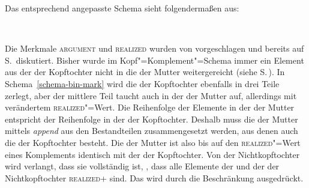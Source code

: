 {Das entsprechend angepasste Schema sieht folgendermaßen aus:
\begin{samepage}
\begin{schema}
\label{schema-bin-mark}
 \impl\\
\end{schema}
\end{samepage}

\noindent
Die Merkmale \textsc{argument} und \textsc{realized} wurden von \citet{Prze99} vorgeschlagen
und bereits auf S.\,\pageref{page-realized} diskutiert. Bisher wurde im Kopf"=Komplement"=Schema
immer ein Element aus der \compsl der Kopftochter nicht in die \compsl der Mutter weitergereicht
(siehe S.\,\pageref{schema-Kopf-Komplementschema-prel2}). In
Schema~\ref{schema-bin-mark} wird die \compsl der Kopftochter ebenfalls in drei Teile zerlegt, aber
der mittlere Teil taucht auch in der \compsl der Mutter auf, allerdings mit verändertem 
\textsc{realized}"=Wert. Die Reihenfolge der Elemente in der \compsl der Mutter entspricht der Reihenfolge in der \compsl der Kopftochter. Deshalb muss
die \compsl der Mutter mittels \emph{append}
aus den Bestandteilen zusammengesetzt werden, aus denen auch die \compsl der Kopftochter
besteht. Die \compsl der Mutter ist also bis auf den \textsc{realized}"=Wert eines Komplements
identisch mit der \compsl der Kopftochter. Von der Nichtkopftochter wird verlangt, dass sie
vollständig ist, \dash, dass alle Elemente der \sprl und der \compsl der Nichtkopftochter \textsc{realized}+
sind. Das wird durch die Beschränkung  ausgedrückt. 

}
